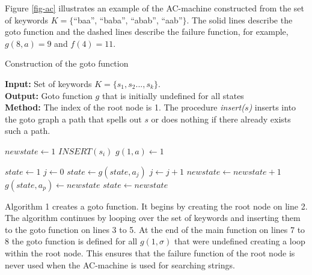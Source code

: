 \documentclass[english,twoside,censored,csm,algorithms-track-2020]{HYthesisML}
\theoremstyle{plain}
\theoremstyle{definition}
\begin{document}
Figure \ref{fig-ac} illustrates an example of the AC-machine constructed from the set of
keywords $K=\{$``baa'', ``baba'', ``abab'', ``aab''$\}$. The solid lines describe the goto function
and the dashed lines describe the failure function, for example, $g(8, a) = 9$ and $f(4)=11$.


\begin{algorithm}[h!]
  
  \caption{Construction of the goto function} \label{ac-goto}
  \hspace*{\algorithmicindent} \textbf{Input:} Set of keywords $K = \{s_1,s_2...,s_k\}$.\\
  \hspace*{\algorithmicindent} \textbf{Output:} Goto function $g$ that is initially undefined for all states\\
  \hspace*{\algorithmicindent} \textbf{Method:} The index of the root node is 1. The procedure \textit{insert($s$)} inserts into the goto graph a path that spells out $s$ or does nothing if there already exists such a path.
  
      \begin{algorithmic}[1]

          \State $newstate\gets 1$
            \State $INSERT(s_i)$
          \EndFor
            \State $g(1,a)\gets 1$
          \EndFor
        \EndFunction

      \item[]

          \State $state\gets 1$
          \State $j\gets 0$
            \State $state\gets g(state,a_j)$
            \State $j\gets j+1$
          \EndWhile
            \State $newstate\gets newstate+1$
            \State $g(state,a_p)\gets newstate$
            \State $state\gets newstate$
          \EndFor
        \EndFunction
      \end{algorithmic}
      
  \end{algorithm}

  Algorithm 1 creates a goto function. It begins by creating the root node on line 2.
  The algorithm continues by looping over the set of keywords and inserting them to the
  goto function on lines 3 to 5. At the end of the main function on lines 7 to 8
  the goto function is defined for all $g(1,\sigma)$ that were undefined creating a loop within
  the root node. This ensures that the failure function of the root node is never used when the
  AC-machine is used for searching strings.
\end{document}
